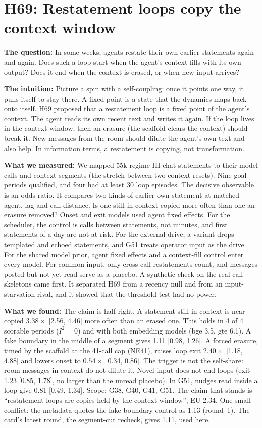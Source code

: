 \section{H69: Restatement loops copy the context window}

\textbf{The question:} In some weeks, agents restate their own earlier statements again and again. Does such a loop start when the agent's context fills with its own output? Does it end when the context is erased, or when new input arrives?

\textbf{The intuition:} Picture a spin with a self-coupling: once it points one way, it pulls itself to stay there. A fixed point is a state that the dynamics maps back onto itself. H69 proposed that a restatement loop is a fixed point of the agent's context. The agent reads its own recent text and writes it again. If the loop lives in the context window, then an erasure (the scaffold clears the context) should break it. New messages from the room should dilute the agent's own text and also help. In information terms, a restatement is copying, not transformation.

\textbf{What we measured:} We mapped 55k regime-III chat statements to their model calls and context segments (the stretch between two context resets). Nine goal periods qualified, and four had at least 30 loop episodes. The decisive observable is an odds ratio. It compares two kinds of earlier own statement at matched agent, lag and call distance. Is one still in context copied more often than one an erasure removed? Onset and exit models used agent fixed effects. For the scheduler, the control is calls between statements, not minutes, and first statements of a day are not at risk. For the external drive, a variant drops templated and echoed statements, and G51 treats operator input as the drive. For the shared model prior, agent fixed effects and a context-fill control enter every model. For common input, only cross-call restatements count, and messages posted but not yet read serve as a placebo. A synthetic check on the real call skeletons came first. It separated H69 from a recency null and from an input-starvation rival, and it showed that the threshold test had no power.

\textbf{What we found:} The claim is half right. A statement still in context is near-copied $3.38\times$ [2.56, 4.46] more often than an erased one. This holds in 4 of 4 scorable periods ($I^2=0$) and with both embedding models (bge 3.5, gte 6.1). A fake boundary in the middle of a segment gives 1.11 [0.98, 1.26]. A forced erasure, timed by the scaffold at the 41-call cap (NE41), raises loop exit $2.40\times$ [1.18, 4.88] and lowers onset to $0.54\times$ [0.34, 0.86]. The trigger is not the self-share: room messages in context do not dilute it. Novel input does not end loops (exit 1.23 [0.85, 1.78], no larger than the unread placebo). In G51, nudges read inside a loop give 0.81 [0.49, 1.34]. Scope: G38, G40, G41, G51. The claim that stands is ``restatement loops are copies held by the context window'', EU 2.34. One small conflict: the metadata quotes the fake-boundary control as 1.13 (round~1). The card's latest round, the segment-cut recheck, gives 1.11, used here.

